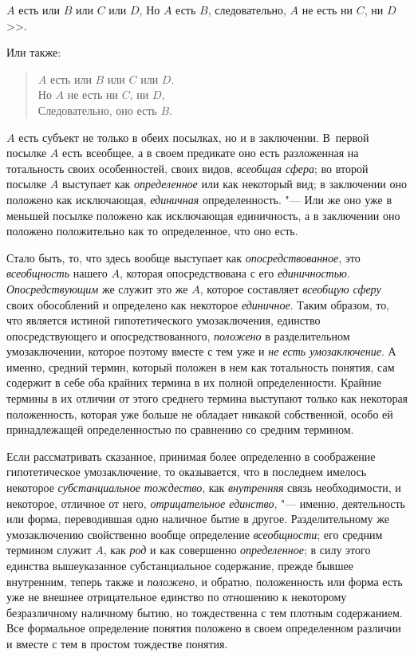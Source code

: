 $A$ есть или $B$ или $C$ или $D$,
Но $A$ есть $B$, следовательно, $A$ не есть ни $C$, ни $D$>>.

Или также:

\begin{verse}
$A$ есть или $B$ или $C$ или $D$.\\
Но $A$ не есть ни $C$, ни $D$,\\
Следовательно, оно есть $B$.
\end{verse}

$A$ есть субъект не только в обеих посылках, но и в заключении.
В~первой посылке $A$ есть всеобщее, а
в своем предикате оно есть разложенная на тотальность своих особенностей,
своих видов, {\em всеобщая сфера}; во второй посылке $A$
выступает как {\em определенное} или
как некоторый вид; в заключении оно положено как исключающая, {\em единичная}
определенность. "--- Или же оно уже в меньшей
посылке положено как исключающая единичность, а в заключении оно положено
положительно как то определенное, что оно есть.

Стало быть, то, что здесь вообще выступает как {\em опосредствованное},
это {\em всеобщность} нашего $A$, которая опосредствована с его
{\em единичностью}. {\em Опосредствующим} же служит это же $A$,
которое составляет {\em всеобщую сферу}
своих обособлений и определено как некоторое {\em единичное}. Таким
образом, то, что является истиной гипотетического умозаключения, единство
опосредствующего и опосредствованного, {\em положено} в
разделительном умозаключении, которое поэтому вместе с тем уже и
{\em не есть умозаключение}.
А именно, средний термин, который положен в нем как
тотальность понятия, сам содержит в себе оба крайних термина в их полной
определенности. Крайние термины в их отличии от этого среднего термина
выступают только как некоторая положенность, которая уже больше не обладает
никакой собственной, особо ей принадлежащей определенностью по сравнению со
средним термином.

Если рассматривать сказанное, принимая более определенно в
соображение гипотетическое умозаключение, то оказывается, что в последнем
имелось некоторое {\em субстанциальное тождество}, как {\em внутренняя} связь
необходимости, и некоторое, отличное от него,
{\em отрицательное единство}, "---
именно, деятельность или форма, переводившая одно наличное
бытие в другое. Разделительному же умозаключению свойственно вообще
определение {\em всеобщности}; его средним термином служит $A$,
как {\em род} и как совершенно {\em определенное}; в
силу этого единства вышеуказанное субстанциальное содержание, прежде бывшее
внутренним, теперь также и {\em положено}, и
обратно, положенность или форма есть уже не внешнее отрицательное единство
по отношению к некоторому безразличному наличному бытию, но тождественна с
тем плотным содержанием. Все формальное определение понятия положено в
своем определенном различии и вместе с тем в простом тождестве понятия.

